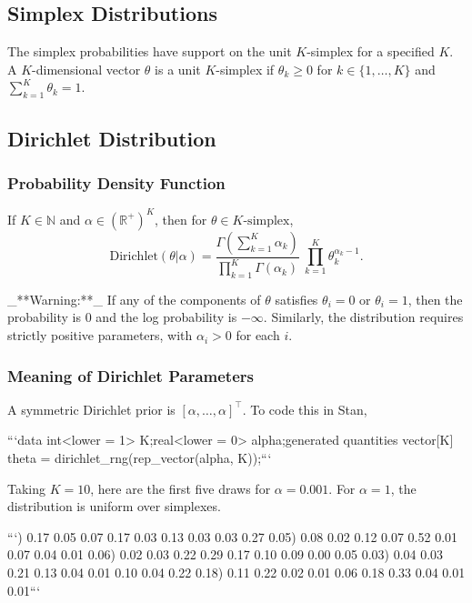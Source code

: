 \begin{description}
{\begin{description}
\chapter{Simplex Distributions}


The simplex probabilities have support on the unit $K$-simplex for a specified $K$.  A $K$-dimensional vector $\theta$ is a unit $K$-simplex if $\theta_k \geq 0$ for $k \in \{1,\ldots,K\}$ and $\sum_{k = 1}^K \theta_k = 1$.


\section{Dirichlet Distribution}


\subsection{Probability Density Function}


If $K \in \mathbb{N}$ and $\alpha \in (\mathbb{R}^+)^{K}$, then for $\theta \in \text{$K$-simplex}$, \[ \text{Dirichlet}(\theta|\alpha) = \frac{\Gamma \! \left( \sum_{k=1}^K \alpha_k \right)}      {\prod_{k=1}^K \Gamma(\alpha_k)} \ \prod_{k=1}^K \theta_k^{\alpha_k - 1} . \] 

 _**Warning:**_  If any of the components of $\theta$ satisfies $\theta_i = 0$ or $\theta_i = 1$, then the probability is 0 and the log probability is $-\infty$.  Similarly, the distribution requires strictly positive parameters, with $\alpha_i > 0$ for each $i$.


\subsection{Meaning of Dirichlet Parameters}


A symmetric Dirichlet prior is $[\alpha, \ldots, \alpha]^{\top}$.  To code this in Stan,


```\n data {\n   int<lower = 1> K;\n   real<lower = 0> alpha;\n }\n generated quantities {\n   vector[K] theta = dirichlet_rng(rep_vector(alpha, K));\n }\n ```


Taking $K = 10$, here are the first five draws for $\alpha = 0.001$. For $\alpha = 1$, the distribution is uniform over simplexes.


```) 0.17 0.05 0.07 0.17 0.03 0.13 0.03 0.03 0.27 0.05) 0.08 0.02 0.12 0.07 0.52 0.01 0.07 0.04 0.01 0.06) 0.02 0.03 0.22 0.29 0.17 0.10 0.09 0.00 0.05 0.03) 0.04 0.03 0.21 0.13 0.04 0.01 0.10 0.04 0.22 0.18) 0.11 0.22 0.02 0.01 0.06 0.18 0.33 0.04 0.01 0.01\n ```



\end{description}}
\end{description}

